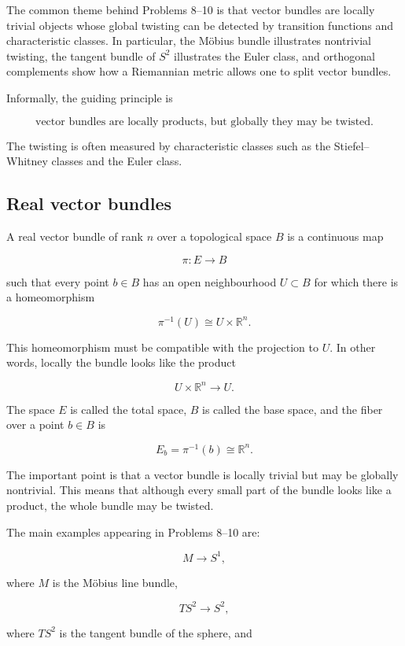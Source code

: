 \documentclass[12pt,a4paper]{article}
\newcommand{\R}{\mathbb{R}}
\theoremstyle{notespace}
\begin{document}
	The common theme behind Problems 8--10 is that vector bundles are locally trivial objects whose global twisting can be detected by transition functions and characteristic classes. In particular, the M\"obius bundle illustrates nontrivial twisting, the tangent bundle of \(S^{2}\) illustrates the Euler class, and orthogonal complements show how a Riemannian metric allows one to split vector bundles.
	
	Informally, the guiding principle is
	
	\[
	\boxed{
		\text{vector bundles are locally products, but globally they may be twisted.}
	}
	\]
	
	The twisting is often measured by characteristic classes such as the Stiefel--Whitney classes and the Euler class.
	
	\subsection{Real vector bundles}
	
	A real vector bundle of rank \(n\) over a topological space \(B\) is a continuous map
	
	\[
	\pi:E\to B
	\]
	
	such that every point \(b\in B\) has an open neighbourhood \(U\subset B\) for which there is a homeomorphism
	
	\[
	\pi^{-1}(U)\cong U\times \R^{n}.
	\]
	
	This homeomorphism must be compatible with the projection to \(U\). In other words, locally the bundle looks like the product
	
	\[
	U\times \R^{n}\to U.
	\]
	
	The space \(E\) is called the total space, \(B\) is called the base space, and the fiber over a point \(b\in B\) is
	
	\[
	E_b=\pi^{-1}(b)\cong \R^{n}.
	\]
	
	The important point is that a vector bundle is locally trivial but may be globally nontrivial. This means that although every small part of the bundle looks like a product, the whole bundle may be twisted.
	
	The main examples appearing in Problems 8--10 are:
	
	\[
	M\to S^{1},
	\]
	
	where \(M\) is the M\"obius line bundle,
	
	\[
	TS^{2}\to S^{2},
	\]
	
	where \(TS^{2}\) is the tangent bundle of the sphere, and
	
\end{document}
